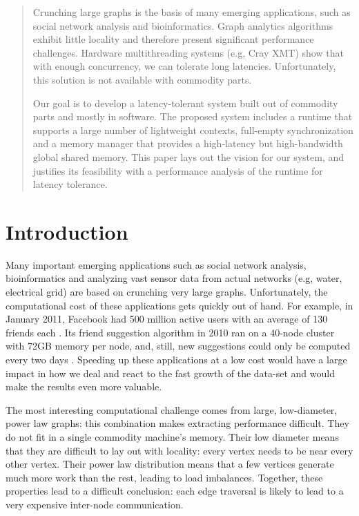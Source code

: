 \documentclass[10pt,nocopyrightspace,preprint]{sigplanconf}
\begin{document}
\begin{abstract}
   Crunching large graphs is the basis of many emerging applications,
   such as social network analysis and bioinformatics. Graph analytics
   algorithms exhibit little locality and therefore present significant
   performance challenges. Hardware multithreading systems (e.g, Cray
   XMT) show that with enough concurrency, we can tolerate long
   latencies. Unfortunately, this solution is not available with
   commodity parts.
 
   Our goal is to develop a latency-tolerant system built out of
   commodity parts and mostly in software. The proposed system includes
   a runtime that supports a large number of lightweight contexts,
   full-empty synchronization and a memory manager that provides a
   high-latency but high-bandwidth global shared memory. This paper
   lays out the vision for our system, and justifies its feasibility
   with a performance analysis of the runtime for latency tolerance.
 
\end{abstract}

\section{Introduction}

Many important emerging applications such as social network analysis,
bioinformatics and analyzing vast sensor data from actual networks
(e.g, water, electrical grid) are based on crunching very large
graphs. Unfortunately, the computational cost of these applications
gets quickly out of hand. For example, in January 2011, Facebook had
500 million active users with an average of 130 friends each
\cite{Facebook:2011p91}. Its friend suggestion algorithm in 2010 ran on
  a 40-node cluster with 72GB memory per node, and, still, new
  suggestions could only be computed every two days
  \cite{Backstrom:2010p90}. Speeding up these applications at a low
  cost would have a large impact in how we deal and react to the fast
  growth of the data-set and would make the results even more
  valuable.



The most interesting computational challenge comes from large,
low-diameter, power law graphs: this combination makes extracting
performance difficult. They do not fit in a single
commodity machine's memory. Their low diameter means that they are
difficult to lay out with locality: every vertex needs to be near every
other vertex. Their power law distribution means that a few vertices
generate much more work than the rest, leading to load
imbalances. Together, these properties lead to a
difficult conclusion: each edge traversal is likely to lead to a very
expensive inter-node communication.
\end{document}
